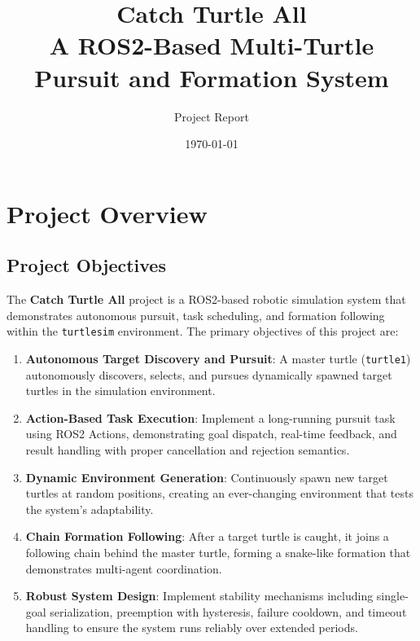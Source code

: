 \documentclass[12pt,a4paper]{article}
\title{\textbf{Catch Turtle All}\\[0.5em]\large A ROS2-Based Multi-Turtle Pursuit and Formation System}
\author{Project Report}
\date{\today}
\begin{document}
\maketitle
\thispagestyle{empty}
\newpage

\tableofcontents
\newpage

\section{Project Overview}
\label{sec:overview}

\subsection{Project Objectives}

The \textbf{Catch Turtle All} project is a ROS2-based robotic simulation system that demonstrates autonomous pursuit, task scheduling, and formation following within the \texttt{turtlesim} environment. The primary objectives of this project are:

\begin{enumerate}[label=\arabic*.]
  \item \textbf{Autonomous Target Discovery and Pursuit}: A master turtle (\texttt{turtle1}) autonomously discovers, selects, and pursues dynamically spawned target turtles in the simulation environment.
  \item \textbf{Action-Based Task Execution}: Implement a long-running pursuit task using ROS2 Actions, demonstrating goal dispatch, real-time feedback, and result handling with proper cancellation and rejection semantics.
  \item \textbf{Dynamic Environment Generation}: Continuously spawn new target turtles at random positions, creating an ever-changing environment that tests the system's adaptability.
  \item \textbf{Chain Formation Following}: After a target turtle is caught, it joins a following chain behind the master turtle, forming a snake-like formation that demonstrates multi-agent coordination.
  \item \textbf{Robust System Design}: Implement stability mechanisms including single-goal serialization, preemption with hysteresis, failure cooldown, and timeout handling to ensure the system runs reliably over extended periods.
\end{enumerate}
\end{document}
